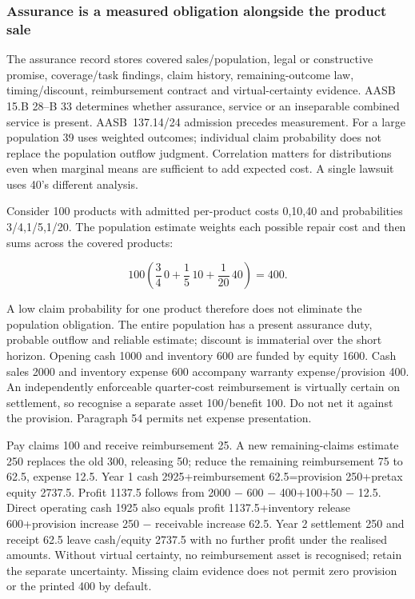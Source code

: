 \hypertarget{assurance-is-a-measured-obligation-alongside-the-product-sale}{%
\subsubsection{Assurance is a measured obligation alongside the product sale}\label{assurance-is-a-measured-obligation-alongside-the-product-sale}}

The assurance record stores covered sales/population, legal or constructive promise, coverage/task findings, claim history, remaining-outcome law, timing/discount, reimbursement contract and virtual-certainty evidence. AASB 15.B 28--B 33 determines whether assurance, service or an inseparable combined service is present. AASB~137.14/24 \citep[paras.~14,24,36--62]{aasb137dated} admission precedes measurement. For a large population 39 uses weighted outcomes; individual claim probability does not replace the population outflow judgment. Correlation matters for distributions even when marginal means are sufficient to add expected cost. A single lawsuit uses 40's different analysis.

Consider 100 products with admitted per-product costs 0,10,40 and probabilities 3/4,1/5,1/20. The population estimate weights each possible repair cost and then sums across the covered products:

\[100\left(\frac34\,0+\frac15\,10+\frac1{20}\,40\right)=400.\]

A low claim probability for one product therefore does not eliminate the population obligation. The entire population has a present assurance duty, probable outflow and reliable estimate; discount is immaterial over the short horizon. Opening cash 1000 and inventory 600 are funded by equity 1600. Cash sales 2000 and inventory expense 600 accompany warranty expense/provision 400. An independently enforceable quarter-cost reimbursement is virtually certain on settlement, so recognise a separate asset 100/benefit 100. Do not net it against the provision. Paragraph 54 permits net expense presentation.

Pay claims 100 and receive reimbursement 25. A new remaining-claims estimate 250 replaces the old 300, releasing 50; reduce the remaining reimbursement 75 to 62.5, expense 12.5. Year 1 cash 2925+reimbursement 62.5=provision 250+pretax equity 2737.5. Profit 1137.5 follows from 2000 − 600 − 400+100+50 − 12.5. Direct operating cash 1925 also equals profit 1137.5+inventory release 600+provision increase 250 − receivable increase 62.5. Year 2 settlement 250 and receipt 62.5 leave cash/equity 2737.5 with no further profit under the realised amounts. Without virtual certainty, no reimbursement asset is recognised; retain the separate uncertainty. Missing claim evidence does not permit zero provision or the printed 400 by default.

